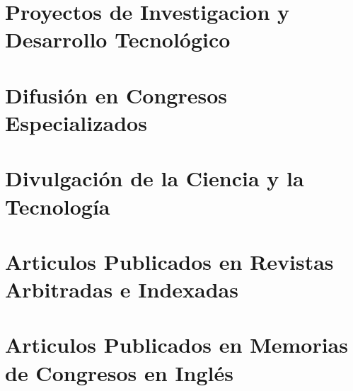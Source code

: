 \documentclass[letterpaper,10pt]{article}
\newcounter{num}
\begin{document}
\section{Proyectos de Investigacion y Desarrollo Tecnológico}
\begin{refsection}[ColaboradorProyectos]
\nocite{*}                                           
\printbibliography[heading={none}, keyword=ColaboradorProyectos, resetnumbers=true]
\end{refsection}



\section{Difusión en Congresos Especializados}
\begin{refsection}[DifusionEnEventos]
\nocite{*}
\printbibliography[heading={none}, keyword=DEPA, resetnumbers=true]
\end{refsection}



\section{Divulgación de la Ciencia y la Tecnología}
\begin{refsection}[DivulgacionCienciaTecnologia]
\nocite{*}
\printbibliography[heading={none}, keyword=DCyT, resetnumbers=true]
\end{refsection}


\section{Articulos Publicados en Revistas Arbitradas e Indexadas}
\begin{refsection}[Revistas]
\nocite{*}
\printbibliography[heading={none}, keyword=three, resetnumbers=true]
\end{refsection}





\section{Articulos Publicados en Memorias de Congresos en Inglés}
\begin{refsection}[CongresosArb]
\nocite{*}
\printbibliography[heading={none}, keyword=four, resetnumbers=true]
\end{refsection}
\end{document}
